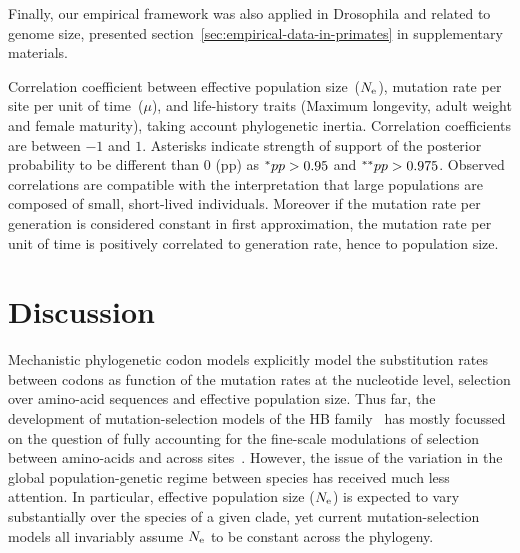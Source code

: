 Finally, our empirical framework was also applied in Drosophila and related to genome size, presented section~\ref{sec:empirical-data-in-primates} in supplementary materials.

\begin{table}[htbp]
    
    \caption[Traits correlation]{
    Correlation coefficient between effective population size~($N_{\text{e}}$), mutation rate per site per unit of time~($\mu$), and life-history traits (Maximum longevity, adult weight and female maturity), taking account phylogenetic inertia.
    Correlation coefficients are between $-1$ and $1$.
    Asterisks indicate strength of support of the posterior probability to be different than $0$ (pp) as $\smash{^{*}} pp > 0.95$ and $\smash{^{**}} pp > 0.975$.
    Observed correlations are compatible with the interpretation that large populations are composed of small, short-lived individuals.
    Moreover if the mutation rate per generation is considered constant in first approximation, the mutation rate per unit of time is positively correlated to generation rate, hence to population size.
    }
    \label{fig:mammals_correlation}
\end{table}

\section{Discussion}
\label{sec:Discussion}
Mechanistic phylogenetic codon models explicitly model the substitution rates between codons as function of the mutation rates at the nucleotide level, selection over amino-acid sequences and effective population size.
Thus far, the development of mutation-selection models of the HB family~\citep{Rodrigue2010, Tamuri2012} has mostly focussed on the question of fully accounting for the fine-scale modulations of selection between amino-acids and across sites~\citep{Rodrigue2010, Tamuri2012}.
However, the issue of the variation in the global population-genetic regime between species has received much less attention.
In particular, effective population size ($N_{\text{e}}$) is expected to vary substantially over the species of a given clade, yet current mutation-selection models all invariably assume $N_{\text{e}}$ to be constant across the phylogeny.

